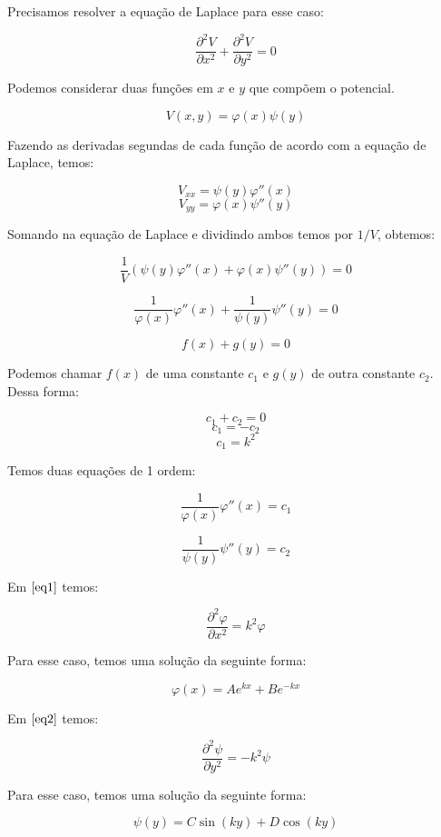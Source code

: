 \documentclass[11pt,a4paper]{article}
\begin{document}
\begin{enumerate}
\begin{enumerate}
Precisamos resolver a equação de Laplace para esse caso:

$$\displaystyle\dfrac{\partial ^2 V}{\partial x^2} + \displaystyle\dfrac{\partial ^2 V}{\partial y^2} = 0$$

Podemos considerar duas funções em $x$ e $y$ que compõem o potencial. 

$$V(x,y) = \varphi (x) \psi (y)$$

Fazendo as derivadas segundas de cada função de acordo com a equação de Laplace, temos:

$$V_{xx} = \psi (y) \varphi '' (x) $$
$$V_{yy} = \varphi (x) \psi '' (y) $$ 

Somando na equação de Laplace e dividindo ambos temos por $1/V$, obtemos:

$$\displaystyle\dfrac{1}{V}(\psi (y) \varphi '' (x) + \varphi (x) \psi '' (y)) = 0$$

$$\displaystyle\dfrac{1}{\varphi (x)}\varphi'' (x) + \displaystyle\dfrac{1}{\psi (y)}\psi'' (y) = 0$$

$$f(x) + g(y) = 0$$

Podemos chamar $f(x)$ de uma constante $c_1$ e $g(y)$ de outra constante $c_2$. Dessa forma:

$$c_1 + c_2 = 0$$
$$c_1 = -c_2$$
$$c_1 = k^2$$

Temos duas equações de 1 ordem:

\begin{equation}
\displaystyle\dfrac{1}{\varphi (x)}\varphi'' (x) = c_1
\label{eq1}
\end{equation}

\begin{equation}
\displaystyle\dfrac{1}{\psi (y)}\psi'' (y) = c_2
\label{eq2}
\end{equation}

Em $\ref{eq1}$ temos:

$$\displaystyle\dfrac{\partial ^2 \varphi}{\partial x^2} = k^2\varphi$$

Para esse caso, temos uma solução da seguinte forma:

\begin{equation}
\varphi (x) = A e^{kx} + B e^{-kx}
\label{eq3}
\end{equation}

Em $\ref{eq2}$ temos:

$$\displaystyle\dfrac{\partial ^2 \psi}{\partial y^2} = - k^2\psi$$

Para esse caso, temos uma solução da seguinte forma:

\begin{equation}
\psi (y) = C \sin(ky) + D \cos(ky)
\label{eq4}
\end{equation}


\end{enumerate}
\end{enumerate}
\end{document}

